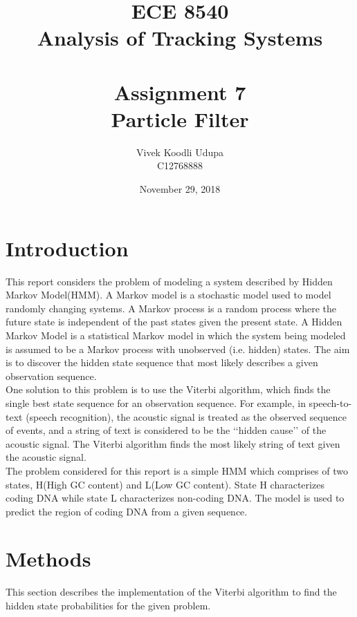 \documentclass[12pt]{article}
\title{ECE 8540 \\ Analysis of Tracking Systems \\ \quad \\
	Assignment 7 \\ Particle Filter}
\author{Vivek Koodli Udupa \\ C12768888}
\date{November 29, 2018 }
\begin{document}
\begin{mdframed}
\maketitle
\end{mdframed}


\section{Introduction}
This report considers the problem of modeling a system described by Hidden Markov Model(HMM). A Markov model is a stochastic model used to model randomly changing systems. A Markov process is a random process where the future state is independent of the past states given the present state. A Hidden Markov Model is a statistical Markov model in which the system being modeled is assumed to be a Markov process with unobserved (i.e. hidden) states. The aim is to discover the hidden state
sequence that most likely describes a given observation sequence. \\

One solution to this problem is to use the Viterbi algorithm, which finds the single best state sequence for an observation sequence. For example, in speech-to-text (speech recognition), the acoustic signal is treated as the observed sequence of events, and a string of text is considered to be the \lq\lq{hidden cause}\rq\rq{} of the acoustic signal. The Viterbi algorithm finds the most likely string of text given the acoustic signal.  \\

The problem considered for this report is a simple HMM which comprises of two states, H(High GC content) and L(Low GC content). State H characterizes coding DNA while state L characterizes non-coding DNA. The model is used to predict the region of coding DNA from a given sequence. 

\section{Methods}
This section describes the implementation of the Viterbi algorithm to find the hidden state probabilities for the given problem. \\
\end{document}
